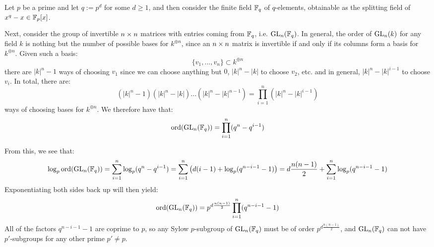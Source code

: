         \begin{remark} \label{remark: modular_general_linear_groups}
            Let $p$ be a prime and let $q := p^d$ for some $d \geq 1$, and then consider the finite field $\mathbb{F}_q$ of $q$-elements, obtainable as the splitting field of $x^q - x \in \mathbb{F}_p[x]$.

            Next, consider the group of invertible $n \x n$ matrices with entries coming from $\mathbb{F}_q$, i.e. $\mathrm{GL}_n(\mathbb{F}_q)$. In general, the order of $\mathrm{GL}_n(k)$ for any field $k$ is nothing but the number of possible bases for $k^{\oplus n}$, since an $n \x n$ matrix is invertible if and only if its columns form a basis for $k^{\oplus n}$. Given such a basis:
                $$\{v_1, ..., v_n\} \subset k^{\oplus n}$$
            there are $|k|^n - 1$ ways of choosing $v_1$ since we can choose anything but $0$, $|k|^n - |k|$ to choose $v_2$, etc. and in general, $|k|^n - |k|^{i - 1}$ to choose $v_i$. In total, there are:
                $$(|k|^n - 1)(|k|^n - |k|) ... (|k|^n - |k|^{n - 1}) = \prod_{i = 1}^n (|k|^n - |k|^{i - 1})$$
            ways of choosing bases for $k^{\oplus n}$. We therefore have that:
                $$\operatorname{ord}( \mathrm{GL}_n(\mathbb{F}_q) ) = \prod_{i = 1}^n (q^n - q^{i - 1})$$

            From this, we see that:
                $$\log_p \operatorname{ord}( \mathrm{GL}_n(\mathbb{F}_q) ) = \sum_{i = 1}^n \log_p (q^n - q^{i - 1}) = \sum_{i = 1}^n \left( d(i - 1) + \log_p( q^{n - i - 1} - 1 ) \right) = d \frac{n(n - 1)}{2} + \sum_{i = 1}^n \log_p( q^{n - i - 1} - 1 )$$
            Exponentiating both sides back up will then yield:
                $$\operatorname{ord}( \mathrm{GL}_n(\mathbb{F}_q) ) = p^{ d \frac{n(n - 1)}{2} } \prod_{i = 1}^n (q^{n - i - 1} - 1)$$
            All of the factors $q^{n - i - 1} - 1$ are coprime to $p$, so any Sylow $p$-subgroup of $\mathrm{GL}_n(\mathbb{F}_q)$ must be of order $p^{ d\frac{n(n - 1)}{2} }$, and $\mathrm{GL}_n(\mathbb{F}_q)$ can not have $p'$-subgroups for any other prime $p' \not = p$.
        \end{remark}

